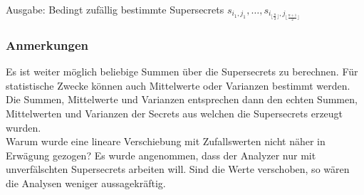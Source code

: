 \documentclass[12pt,a4paper]{scrartcl}
\begin{document}
Ausgabe: Bedingt zufällig bestimmte Supersecrets $s_{i_1,j_1},\ldots,s_{i_{\lfloor\frac{n}{2} \rfloor},j_{\lfloor\frac{n+1}{2} \rfloor}}$

\subsubsection*{Anmerkungen}
Es ist weiter möglich beliebige Summen über die Supersecrets zu berechnen. Für statistische Zwecke können auch Mittelwerte oder Varianzen bestimmt werden. Die Summen, Mittelwerte und Varianzen entsprechen dann den echten Summen, Mittelwerten und Varianzen der Secrets aus welchen die Supersecrets erzeugt wurden.\\
Warum wurde eine lineare Verschiebung mit Zufallswerten nicht näher in Erwägung gezogen? Es wurde angenommen, dass der Analyzer nur mit unverfälschten Supersecrets arbeiten will. Sind die Werte verschoben, so wären die Analysen weniger aussagekräftig. 
\end{document}
